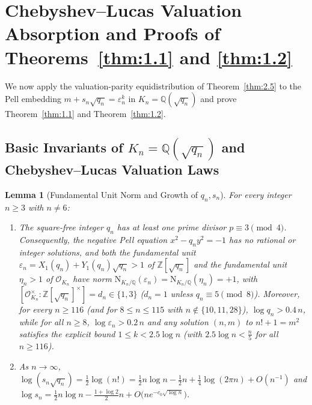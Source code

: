 \documentclass[11pt,reqno]{amsart}
\newtheorem{lemma}[theorem]{Lemma}
\theoremstyle{remark}
\numberwithin{equation}{section}
\newcommand{\Z}{\mathbb{Z}}
\newcommand{\Q}{\mathbb{Q}}
\begin{document}
\section{Chebyshev--Lucas Valuation Absorption and Proofs of Theorems~\ref{thm:1.1} and \ref{thm:1.2}}\label{sec:3}

We now apply the valuation-parity equidistribution of Theorem~\ref{thm:2.5} to the Pell embedding $m + s_n\sqrt{q_n} = \varepsilon_n^k$ in $K_n = \Q(\sqrt{q_n})$ and prove Theorem~\ref{thm:1.1} and Theorem~\ref{thm:1.2}.

\subsection{Basic Invariants of $K_n = \Q(\sqrt{q_n})$ and Chebyshev--Lucas Valuation Laws}

\begin{lemma}[{Fundamental Unit Norm and Growth of $q_n, s_n$}]\label{lem:3.1}
For every integer $n \ge 3$ with $n \ne 6$:
\begin{enumerate}
\item[(i)] The square-free integer $q_n$ has at least one prime divisor $p \equiv 3 \pmod 4$. Consequently, the negative Pell equation $x^2 - q_n y^2 = -1$ has no rational or integer solutions, and both the fundamental unit $\varepsilon_n = X_1(q_n) + Y_1(q_n)\sqrt{q_n} > 1$ of $\Z[\sqrt{q_n}]$ and the fundamental unit $\eta_n > 1$ of $\mathcal{O}_{K_n}$ have norm $\mathrm{N}_{K_n/\Q}(\varepsilon_n) = \mathrm{N}_{K_n/\Q}(\eta_n) = +1$, with $[\mathcal{O}_{K_n}^\times : \Z[\sqrt{q_n}]^\times] = d_n \in \{1, 3\}$ ($d_n = 1$ unless $q_n \equiv 5 \pmod 8$). Moreover, for every $n \ge 116$ (and for $8 \le n \le 115$ with $n \notin \{10, 11, 28\}$), $\log q_n > 0.4\,n$, while for all $n \ge 8$, $\log \varepsilon_n > 0.2\,n$ and any solution $(n, m)$ to $n! + 1 = m^2$ satisfies the explicit bound $1 \le k < 2.5\log n$ (with $2.5\log n < \frac{n}{5}$ for all $n \ge 116$).
\item[(ii)] As $n \to \infty$, $\log(s_n\sqrt{q_n}) = \frac{1}{2}\log(n!) = \frac{1}{2}n\log n - \frac{1}{2}n + \frac{1}{4}\log(2\pi n) + O(n^{-1})$ and $\log s_n = \frac{1}{2}n\log n - \frac{1+\log 2}{2}n + O\bigl(ne^{-c_0\sqrt{\log n}}\bigr)$.
\end{enumerate}
\end{lemma}
\end{document}
